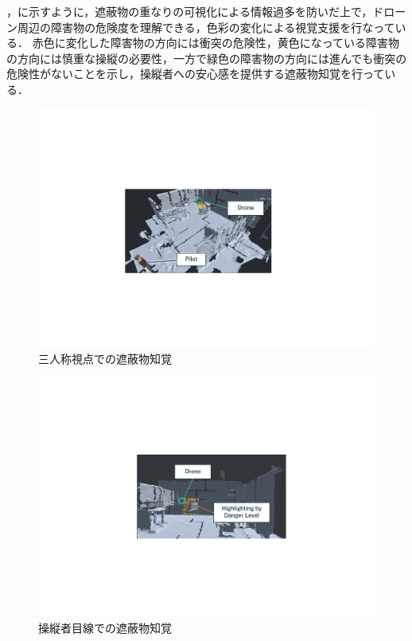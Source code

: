 \documentclass[a4paper,11pt]{ujreport}
\begin{document}
，に示すように，遮蔽物の重なりの可視化による情報過多を防いだ上で，ドローン周辺の障害物の危険度を理解できる，色彩の変化による視覚支援を行なっている．
赤色に変化した障害物の方向には衝突の危険性，黄色になっている障害物の方向には慎重な操縦の必要性，一方で緑色の障害物の方向には進んでも衝突の危険性がないことを示し，操縦者への安心感を提供する遮蔽物知覚を行っている．

\begin{figure}[!tb]
  \centering
  \includegraphics[width=0.9\linewidth]{img/03_danger1.pdf}
  \caption{三人称視点での遮蔽物知覚}
  \label{fig:03_dangerLevel1}
\end{figure}
\begin{figure}[!tb]
  \centering
  \includegraphics[width=0.9\linewidth]{img/03_danger2.pdf}
  \caption{操縦者目線での遮蔽物知覚}
  \label{fig:03_dangerLevel2}
\end{figure}
\end{document}
